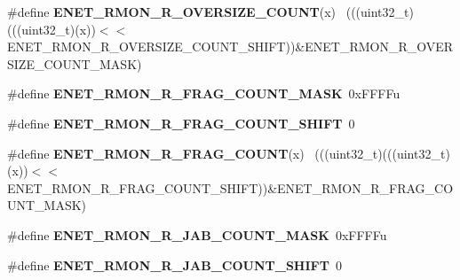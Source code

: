 \begin{DoxyCompactItemize}
\item 
\hypertarget{group___e_n_e_t___register___masks_ga4262496729ce196f47c8bcf5b01de925}{}\#define {\bfseries E\+N\+E\+T\+\_\+\+R\+M\+O\+N\+\_\+\+R\+\_\+\+O\+V\+E\+R\+S\+I\+Z\+E\+\_\+\+C\+O\+U\+N\+T}(x)                    ~(((uint32\+\_\+t)(((uint32\+\_\+t)(x))$<$$<$E\+N\+E\+T\+\_\+\+R\+M\+O\+N\+\_\+\+R\+\_\+\+O\+V\+E\+R\+S\+I\+Z\+E\+\_\+\+C\+O\+U\+N\+T\+\_\+\+S\+H\+I\+F\+T))\&E\+N\+E\+T\+\_\+\+R\+M\+O\+N\+\_\+\+R\+\_\+\+O\+V\+E\+R\+S\+I\+Z\+E\+\_\+\+C\+O\+U\+N\+T\+\_\+\+M\+A\+S\+K)\label{group___e_n_e_t___register___masks_ga4262496729ce196f47c8bcf5b01de925}

\item 
\hypertarget{group___e_n_e_t___register___masks_ga5f5c83f39cebf731ec8d463d94ce3f03}{}\#define {\bfseries E\+N\+E\+T\+\_\+\+R\+M\+O\+N\+\_\+\+R\+\_\+\+F\+R\+A\+G\+\_\+\+C\+O\+U\+N\+T\+\_\+\+M\+A\+S\+K}~0x\+F\+F\+F\+Fu\label{group___e_n_e_t___register___masks_ga5f5c83f39cebf731ec8d463d94ce3f03}

\item 
\hypertarget{group___e_n_e_t___register___masks_ga5ef532dea7d45ccc23afff7d7c17c16f}{}\#define {\bfseries E\+N\+E\+T\+\_\+\+R\+M\+O\+N\+\_\+\+R\+\_\+\+F\+R\+A\+G\+\_\+\+C\+O\+U\+N\+T\+\_\+\+S\+H\+I\+F\+T}~0\label{group___e_n_e_t___register___masks_ga5ef532dea7d45ccc23afff7d7c17c16f}

\item 
\hypertarget{group___e_n_e_t___register___masks_ga11cacacecb12ef59341d293afb9bcf56}{}\#define {\bfseries E\+N\+E\+T\+\_\+\+R\+M\+O\+N\+\_\+\+R\+\_\+\+F\+R\+A\+G\+\_\+\+C\+O\+U\+N\+T}(x)                            ~(((uint32\+\_\+t)(((uint32\+\_\+t)(x))$<$$<$E\+N\+E\+T\+\_\+\+R\+M\+O\+N\+\_\+\+R\+\_\+\+F\+R\+A\+G\+\_\+\+C\+O\+U\+N\+T\+\_\+\+S\+H\+I\+F\+T))\&E\+N\+E\+T\+\_\+\+R\+M\+O\+N\+\_\+\+R\+\_\+\+F\+R\+A\+G\+\_\+\+C\+O\+U\+N\+T\+\_\+\+M\+A\+S\+K)\label{group___e_n_e_t___register___masks_ga11cacacecb12ef59341d293afb9bcf56}

\item 
\hypertarget{group___e_n_e_t___register___masks_ga838c0d34688a6347e786a3a66de2fc66}{}\#define {\bfseries E\+N\+E\+T\+\_\+\+R\+M\+O\+N\+\_\+\+R\+\_\+\+J\+A\+B\+\_\+\+C\+O\+U\+N\+T\+\_\+\+M\+A\+S\+K}~0x\+F\+F\+F\+Fu\label{group___e_n_e_t___register___masks_ga838c0d34688a6347e786a3a66de2fc66}

\item 
\hypertarget{group___e_n_e_t___register___masks_gaec7a433149507aefe611734ae19e7878}{}\#define {\bfseries E\+N\+E\+T\+\_\+\+R\+M\+O\+N\+\_\+\+R\+\_\+\+J\+A\+B\+\_\+\+C\+O\+U\+N\+T\+\_\+\+S\+H\+I\+F\+T}~0\label{group___e_n_e_t___register___masks_gaec7a433149507aefe611734ae19e7878}


\end{DoxyCompactItemize}
